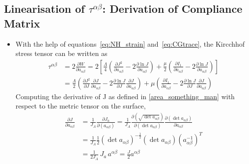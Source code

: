 \subsection{Linearisation of \texorpdfstring{$\tau^{\alpha \beta}$: Derivation of Compliance Matrix}{Kircchhof stress tensor}} \label{appendices:compliance_matrix_curvy}
\begin{itemize}
\item With the help of equations~\eqref{eq:NH_strain} and~\eqref{eq:CGtrace}, the Kircchhof stress tensor can be written as
\begin{equation}\label{eq:kirch_NH}
    \begin{split}
        \tau^{\alpha \beta} &= 2 \frac{\partial W}{\partial a_{\alpha \beta}} = 2 \left[ \frac{\Lambda}{4} \left( \frac{\partial J^{2}}{\partial a_{\alpha \beta}} - 2 \frac{\partial \ln{J}}{\partial a_{\alpha \beta}} \right) + \frac{\mu}{2} \left( \frac{\partial I_{1}}{\partial a_{\alpha \beta}} - 2 \frac{\partial \ln{J}}{\partial a_{\alpha \beta}} \right) \right] \\ &= \frac{\Lambda}{2} \left( \frac{\partial J^{2}}{\partial J} \frac{\partial J}{\partial a_{\alpha \beta}} - 2 \frac{\partial \ln{J}}{\partial J} \frac{\partial J}{\partial a_{\alpha \beta}} \right) + \mu \left( \frac{\partial I_{1}}{\partial a_{\alpha \beta}} - 2 \frac{\partial \ln{J}}{\partial J} \frac{\partial J}{\partial a_{\alpha \beta}} \right) 
    \end{split}
\end{equation}
Computing the derivative of J as defined in \eqref{area_something_man} with respect to the metric tensor on the surface,
\begin{equation}\label{eq:dJdaab}
    \begin{split}
    \frac{\partial J}{\partial a_{\alpha \beta}} &= \frac{1}{J_{A}} \frac{\partial J_{a}}{\partial (a_{\alpha \beta})} = \frac{1}{J_{A}} \frac{\partial \left(\sqrt{\det{a_{\alpha \beta}}}\right)}{\partial \left(\det{a_{\alpha \beta}}\right)} \frac{\partial \left(\det{a_{\alpha \beta}}\right)}{\partial a_{\alpha \beta}} \\ &= \frac{1}{J_{A}} \frac{1}{2} \left(\det{a_{\alpha \beta}}\right)^{-\frac{1}{2}} \left(\det{a_{\alpha \beta}}\right) \left( a_{\alpha \beta}^{-1} \right)^{T}\\ &= \frac{1}{2 J_{A}}\, J_{a} \,a^{\alpha \beta} = \frac{J}{2} a^{\alpha \beta}
    \end{split}
\end{equation}


\end{itemize}

